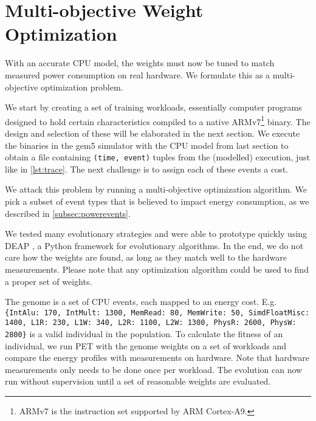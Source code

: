 \section{Multi-objective Weight Optimization}

With an accurate CPU model, the weights must now be tuned to match measured
power consumption on real hardware. We formulate this as a multi-objective
optimization problem.

We start by creating a set of training workloads, essentially computer programs
designed to hold certain characteristics compiled to a native
ARMv7\footnote{ARMv7 is the instruction set supported by ARM Cortex-A9.} binary.
The design and selection of these will be elaborated in the next section. We
execute the binaries in the gem5 simulator with the CPU model from last
section to obtain a file containing \texttt{(time, event)} tuples from the
(modelled) execution, just like in \autoref{lst:trace}. The next challenge is to
assign each of these events a cost.

We attack this problem by running a multi-objective optimization algorithm. We
pick a subset of event types that is believed to impact energy consumption, as
we described in \autoref{subsec:powerevents}.



We tested many evolutionary strategies
and were able to prototype quickly using DEAP \cite{DEAP_JMLR2012}, a Python
framework for evolutionary algorithms. In the end, we do not care how the
weights are found, as long as they match well to the hardware measurements.
Please note that any optimization algorithm could be used to find a proper set
of weights.

The genome is a set of CPU events, each mapped to an energy cost. E.g.
\texttt{\{IntAlu: 170, IntMult: 1300, MemRead: 80, MemWrite: 50, SimdFloatMisc:
1400, L1R: 230, L1W: 340, L2R: 1100, L2W: 1300, PhysR: 2600, PhysW: 2800\}} is a
valid individual in the population. To calculate the fitness of an individual,
we run PET with the genome weights on a set of workloads and compare the energy
profiles with measurements on hardware. Note that hardware measurements only
needs to be done once per workload. The evolution can now run without
supervision until a set of reasonable weights are evaluated.
